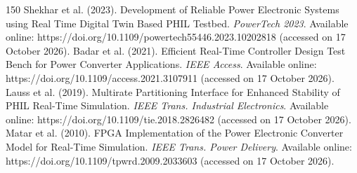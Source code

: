 \begin{thebibliography}{150}
Shekhar et al. (2023). Development of Reliable Power Electronic Systems using Real Time Digital Twin Based PHIL Testbed. \textit{PowerTech 2023}. Available online: https://doi.org/10.1109/powertech55446.2023.10202818 (accessed on 17 October 2026).
Badar et al. (2021). Efficient Real-Time Controller Design Test Bench for Power Converter Applications. \textit{IEEE Access}. Available online: https://doi.org/10.1109/access.2021.3107911 (accessed on 17 October 2026).
Lauss et al. (2019). Multirate Partitioning Interface for Enhanced Stability of PHIL Real-Time Simulation. \textit{IEEE Trans. Industrial Electronics}. Available online: https://doi.org/10.1109/tie.2018.2826482 (accessed on 17 October 2026).
Matar et al. (2010). FPGA Implementation of the Power Electronic Converter Model for Real-Time Simulation. \textit{IEEE Trans. Power Delivery}. Available online: https://doi.org/10.1109/tpwrd.2009.2033603 (accessed on 17 October 2026).
\end{thebibliography}
